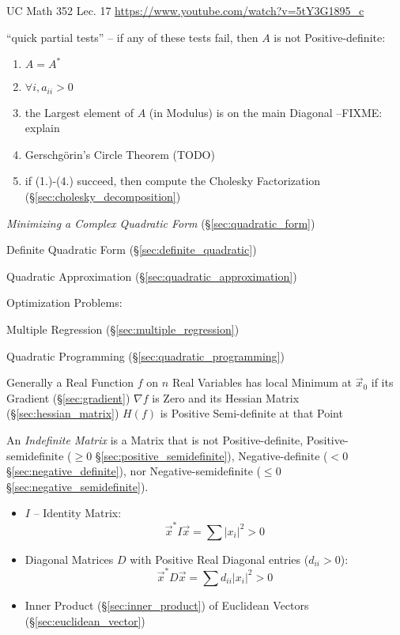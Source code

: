 UC Math 352 Lec. 17 \url{https://www.youtube.com/watch?v=5tY3G1895_c}

``quick partial tests'' -- if any of these tests fail, then $A$ is not
Positive-definite:
\begin{enumerate}
  \item $A = A^*$
  \item $\forall{i}, a_{ii} > 0$
  \item the Largest element of $A$ (in Modulus) is on the main Diagonal
    --FIXME: explain
  \item Gerschg\"orin's Circle Theorem (TODO)
  \item if (1.)-(4.) succeed, then compute the Cholesky Factorization
    (\S\ref{sec:cholesky_decomposition})
\end{enumerate}

\emph{Minimizing a Complex Quadratic Form} (\S\ref{sec:quadratic_form})

\fist Definite Quadratic Form (\S\ref{sec:definite_quadratic})

\fist Quadratic Approximation (\S\ref{sec:quadratic_approximation})

Optimization Problems:

\fist Multiple Regression (\S\ref{sec:multiple_regression})

\fist Quadratic Programming (\S\ref{sec:quadratic_programming})

Generally a Real Function $f$ on $n$ Real Variables has local Minimum at
$\vec{x}_0$ if its Gradient (\S\ref{sec:gradient}) $\nabla f$ is Zero and its
Hessian Matrix (\S\ref{sec:hessian_matrix}) $H(f)$ is Positive Semi-definite at
that Point

An \emph{Indefinite Matrix} is a Matrix that is not Positive-definite,
Positive-semidefinite ($\geq 0$ \S\ref{sec:positive_semidefinite}),
Negative-definite ($< 0$ \S\ref{sec:negative_definite}), nor
Negative-semidefinite ($\leq 0$ \S\ref{sec:negative_semidefinite}).

\begin{itemize}
  \item $I$ -- Identity Matrix:
    \[
      \vec{x}^*I\vec{x} = \sum |x_i|^2 > 0
    \]
  \item Diagonal Matrices $D$ with Positive Real Diagonal entries ($d_{ii} >
    0$):
    \[
      \vec{x}^*D\vec{x} = \sum d_{ii}|x_i|^2 > 0
    \]
  \item Inner Product (\S\ref{sec:inner_product}) of Euclidean Vectors
    (\S\ref{sec:euclidean_vector})
\end{itemize}


